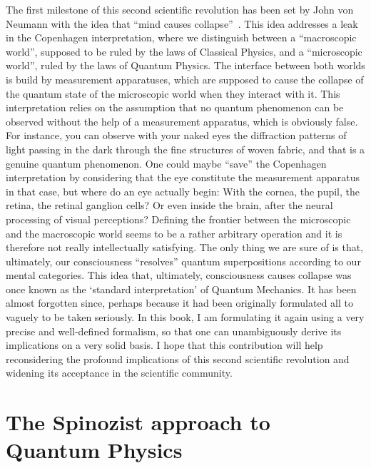 \documentclass[10pt,a4paper,twoside,openany]{book}
\begin{document}
The first milestone of this second scientific revolution has been set by John von Neumann with the idea that ``mind causes collapse''~\cite{Neumann1932}. This idea addresses a leak in the Copenhagen interpretation, where we distinguish between a ``macroscopic world'', supposed to be ruled by the laws of Classical Physics, and a ``microscopic world'', ruled by the laws of Quantum Physics. The interface between both worlds is build by measurement apparatuses, which are supposed to cause the collapse of the quantum state of the microscopic world when they interact with it. This interpretation relies on the assumption that no quantum phenomenon can be observed without the help of a measurement apparatus, which is obviously false. For instance, you can observe with your naked eyes the diffraction patterns of light passing in the dark through the fine structures of woven fabric, and that is a genuine quantum phenomenon. One could maybe ``save'' the Copenhagen interpretation by considering that the eye constitute the measurement apparatus in that case, but where do an eye actually begin: With the cornea, the pupil, the retina, the retinal ganglion cells? Or even inside the brain, after the neural processing of visual perceptions? Defining the frontier between the microscopic and the macroscopic world seems to be a rather arbitrary operation and it is therefore not really intellectually satisfying. The only thing we are sure of is that, ultimately, our consciousness ``resolves'' quantum superpositions according to our mental categories. This idea that, ultimately, consciousness causes collapse was once known as the `standard interpretation' of Quantum Mechanics. It has been almost forgotten since, perhaps because it had been originally formulated all to vaguely to be taken seriously. In this book, I am formulating it again using a very precise and well-defined formalism, so that one can unambiguously derive its implications on a very solid basis. I hope that this contribution will help reconsidering the profound implications of this second scientific revolution and widening its acceptance in the scientific community.

\section{The Spinozist approach to Quantum Physics}
\end{document}
